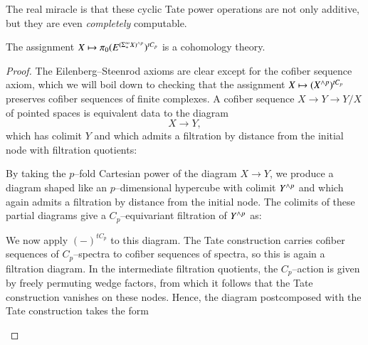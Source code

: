 The real miracle is that these cyclic Tate power operations are not only additive, but they are even \emph{completely} computable.

\begin{lemma}\label{TateConstructionIsACohomThy}
The assignment $X \mapsto \pi_0 (E^{(\Sigma^\infty_+ X)^{\wedge p}})^{tC_p}$ is a cohomology theory.
\end{lemma}
\begin{proof}
The Eilenberg--Steenrod axioms are clear except for the cofiber sequence axiom, which we will boil down to checking that the assignment $X \mapsto (X^{\wedge p})^{tC_p}$ preserves cofiber sequences of finite complexes.  A cofiber sequence $X \to Y \to Y/X$ of pointed spaces is equivalent data to the diagram \[X \to Y,\] which has colimit $Y$ and which admits a filtration by distance from the initial node with filtration quotients:
\begin{center}
\end{center}
By taking the $p$--fold Cartesian power of the diagram $X \to Y$, we produce a diagram shaped like an $p$--dimensional hypercube with colimit $Y^{\wedge p}$ and which again admits a filtration by distance from the initial node.  The colimits of these partial diagrams give a $C_p$--equivariant filtration of $Y^{\wedge p}$ as:
\begin{center}
\end{center}
We now apply $(-)^{tC_p}$ to this diagram.  The Tate construction carries cofiber sequences of $C_p$--spectra to cofiber sequences of spectra, so this is again a filtration diagram.  In the intermediate filtration quotients, the $C_p$--action is given by freely permuting wedge factors, from which it follows that the Tate construction vanishes on these nodes.  Hence, the diagram postcomposed with the Tate construction takes the form
\begin{center}

\end{center}
\end{proof}

